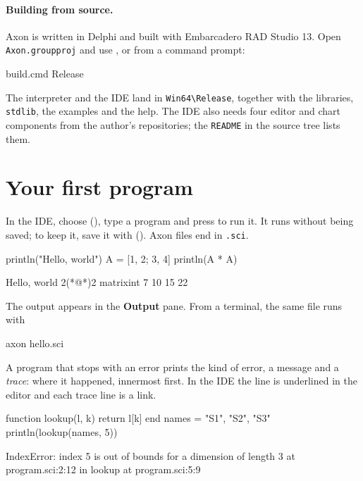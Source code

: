 \documentclass[11pt,a4paper,openany]{report}
\begin{document}
\paragraph{Building from source.} Axon is written in Delphi and built with
Embarcadero RAD Studio 13. Open \texttt{Axon.groupproj} and use
, or from a command prompt:

\begin{shell}
build.cmd Release
\end{shell}

The interpreter and the IDE land in \texttt{Win64\textbackslash Release},
together with the libraries, \texttt{stdlib}, the examples and the help. The
IDE also needs four editor and chart components from the author's
repositories; the \texttt{README} in the source tree lists them.

\section{Your first program}

In the IDE, choose  (), type a program and press
 to run it. It runs without being saved; to keep it, save it with
 (). Axon files end in \texttt{.sci}.

\begin{axon}
println("Hello, world")
A = [1, 2; 3, 4]
println(A * A)
\end{axon}
\begin{axonout}
Hello, world
2(*@\texttimes@*)2 matrix{int}
   7  10
  15  22
\end{axonout}

The output appears in the \textbf{Output} pane. From a terminal, the same file
runs with

\begin{shell}
axon hello.sci
\end{shell}

A program that stops with an error prints the kind of error, a message and a
\emph{trace}: where it happened, innermost first. In the IDE the line is
underlined in the editor and each trace line is a link.

\begin{axonerr}
function lookup(l, k)
  return l[k]
end
names = {"S1", "S2", "S3"}
println(lookup(names, 5))
\end{axonerr}
\begin{axonout}
IndexError: index 5 is out of bounds for a dimension of length 3
  at program.sci:2:12 in lookup
  at program.sci:5:9
\end{axonout}
\end{document}
